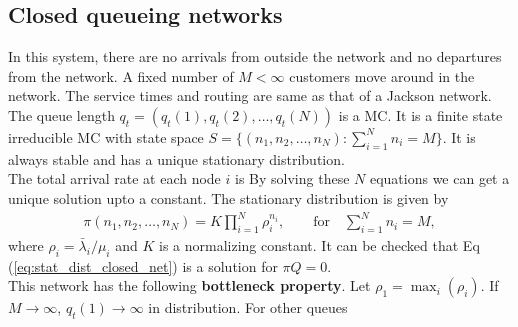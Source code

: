 \documentclass[all-lectures.tex]{subfiles}
\begin{document}
\subsection{Closed queueing networks}
In this system, there are no arrivals from outside the network and no departures from the network.  A fixed number of $M < \infty$ customers move around in the network. The service times and routing are same as that of a Jackson network. The queue length $q_t = (q_t(1), q_t(2), \dots , q_t(N))$ is a MC. It is a finite state irreducible MC with state space $S = \{(n_1,n_2,\dots,n_N): \sum_{i=1}^N n_i = M\}$. It is always stable and has a unique stationary distribution. \\
\indent The total arrival rate at each node $i$ is 
By solving these $N$ equations we can get a unique solution upto a constant.
The stationary distribution is given by
\begin{align}\label{eq:stat_dist_closed_net}
\pi(n_1, n_2, \dots, n_N) = K \prod_{i=1}^{N} \rho_i^{n_i}, \quad \quad \text{for} \quad \sum_{i=1}^{N} n_i = M,
\end{align}
where $\rho_i = \bar{\lambda}_i/\mu_i$ and $K$ is a normalizing constant. It can be checked that Eq (\ref{eq:stat_dist_closed_net}) is a solution for $\pi Q = 0$.\\
\indent This network has the following \textbf{bottleneck property}. Let $\rho_1 = \max_i( \rho_i)$. If $M \to \infty$, $q_t(1) \to \infty$ in distribution. For other queues
\end{document}
